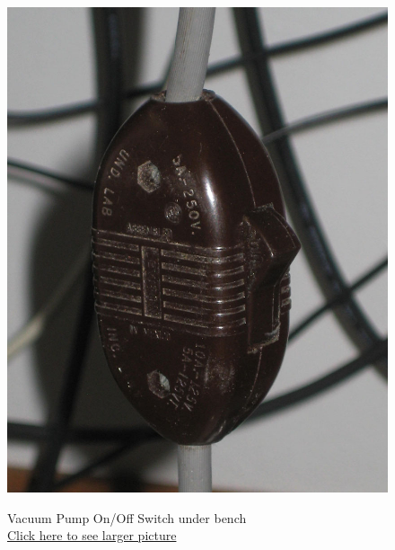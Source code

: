 \documentclass{../lab}
\begin{document}
\begin{figure}[H]
\captionsetup{justification=centering}
  \href{http://experimentationlab.berkeley.edu/sites/default/files/images/Pump_Switch_3535-Lg.jpg}{\includegraphics[width=\linewidth,keepaspectratio]{images/Pump_Switch_3535-Lg.jpg}}
  \caption{Vacuum Pump On/Off Switch under bench \\ \href{http://experimentationlab.berkeley.edu/sites/default/files/images/Pump_Switch_3535-Lg.jpg}{Click here to see larger picture}}\label{fig:Pump_Switch_3535-Lg.jpg}
\endminipage\hfill
{}

\end{figure}
\end{document}
